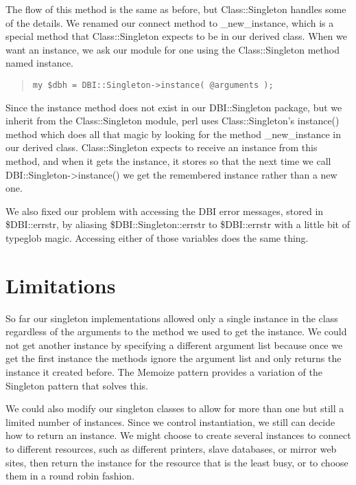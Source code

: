 The flow of this method is the same as before, but
Class::Singleton handles some of the details.  We renamed
our connect method to \_new\_instance, which is a special
method that Class::Singleton expects to be in our derived
class. When we want an instance, we ask our module for one
using the Class::Singleton method named instance.

\begin{quote}    
\begin{verbatim}
my $dbh = DBI::Singleton->instance( @arguments );
\end{verbatim}
\end{quote}    

Since the instance method does not exist in our
DBI::Singleton package, but we inherit from the
Class::Singleton module, perl uses Class::Singleton's 
instance() method which does all that magic by looking for
the method \_new\_instance in our derived class.
Class::Singleton expects to receive an instance from this
method, and when it gets the instance, it stores so that the
next time we call DBI::Singleton->instance() we get the
remembered instance rather than a new one.


We also fixed our problem with accessing the DBI error
messages, stored in \$DBI::errstr, by aliasing
\$DBI::Singleton::errstr to \$DBI::errstr with a little bit
of typeglob magic.  Accessing either of those variables does
the same thing.

    \section{Limitations}
    
So far our singleton implementations allowed only a single
instance in the class regardless of the arguments to the
method we used to get the instance.  We could not get
another instance by specifying a different argument list
because once we get the first instance the methods ignore
the argument list and only returns the instance it created
before.  The Memoize pattern provides a variation of the
Singleton pattern that solves this.

We could also modify our singleton classes to allow for more
than one but still a limited number of instances.  Since we
control instantiation, we still can decide how to return an
instance.  We might choose to create several instances to
connect to different resources, such as different printers,
slave databases, or mirror web sites, then return the
instance for the resource that is the least busy, or to
choose them in a round robin fashion.

